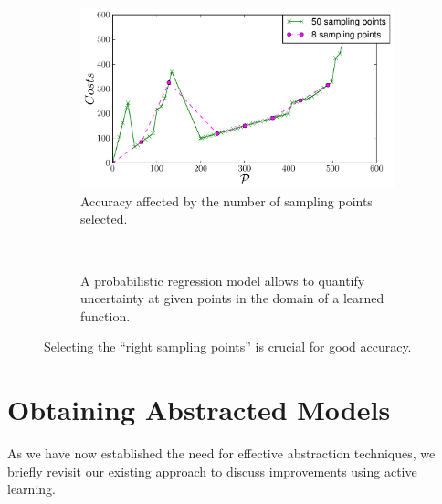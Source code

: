 \documentclass[conference]{IEEEtran}
\begin{document}
\begin{figure}
        \centering
        \begin{subfigure}[b]{\columnwidth}
        \centering
                \includegraphics[width=\textwidth]{img/powerToCosts}
                \caption{Accuracy affected by the number of sampling points selected.}
                \label{fig:sampling}
        \end{subfigure}%
        ~ \qquad%
        \begin{subfigure}[b]{\columnwidth}
        \centering
                \caption{A probabilistic regression model allows to quantify uncertainty at given points in the domain of a learned function.}
                \label{fig:mouse}
        \end{subfigure}
        \caption{Selecting the ``right sampling points'' is crucial for good accuracy.}
\end{figure}



\section{Obtaining Abstracted Models}
As we have now established the need for effective abstraction
techniques, we briefly revisit our existing approach to 
discuss improvements using active learning.
\end{document}
